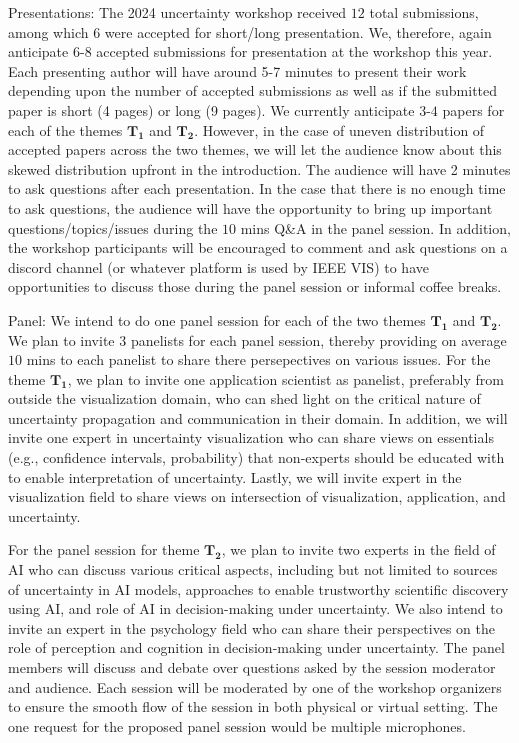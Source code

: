 {\large Presentations:} The 2024 uncertainty workshop received $12$ total submissions, among which $6$ were accepted for short/long presentation. We, therefore, again anticipate $6$-$8$ accepted submissions for presentation at the workshop this year. Each presenting author will have around 5-7 minutes to present their work depending upon the number of accepted submissions as well as if the submitted paper is short (4 pages) or long (9 pages). We currently anticipate $3$-$4$ papers for each of the themes $\mathbf{T_1}$ and $\mathbf{T_2}$. However, in the case of uneven distribution of accepted papers across the two themes, we will let the audience know about this skewed distribution upfront in the introduction. The audience will have 2 minutes to ask questions after each presentation. In the case that there is no enough time to ask questions, the audience will have the opportunity to bring up important questions/topics/issues during the  $10$ mins Q\&A in the panel session. In addition, the workshop participants will be encouraged to comment and ask questions on a discord channel (or whatever platform is used by IEEE VIS) to have opportunities to discuss those during the panel session or informal coffee breaks. 

{\large Panel:} We intend to do one panel session for each of the two themes $\mathbf{T_1}$ and $\mathbf{T_2}$. We plan to invite $3$ panelists for each panel session, thereby providing on average $10$ mins to each panelist to share there persepectives on various issues. For the theme $\mathbf{T_1}$, we plan to invite one application scientist as panelist, preferably from outside the visualization domain, who can shed light on the critical nature of uncertainty propagation and communication in their domain. In addition, we will invite one expert in uncertainty visualization who can share views on essentials (e.g., confidence intervals, probability) that non-experts should be educated with to enable interpretation of uncertainty. Lastly, we will invite expert in the visualization field to share views on intersection of visualization, application, and uncertainty.  

For the panel session for theme $\mathbf{T_2}$, we plan to invite two experts in the field of AI who can discuss various critical aspects, including but not limited to sources of uncertainty in AI models, approaches to enable trustworthy scientific discovery using AI, and role of AI in decision-making under uncertainty. We also intend to invite an expert in the psychology field who can share their perspectives on the role of perception and cognition in decision-making under uncertainty. The panel members will discuss and debate over questions asked by the session moderator and audience. Each session will be moderated by one of the workshop organizers to ensure the smooth flow of the session in both physical or virtual setting. The one request for the proposed panel session would be multiple microphones. 

